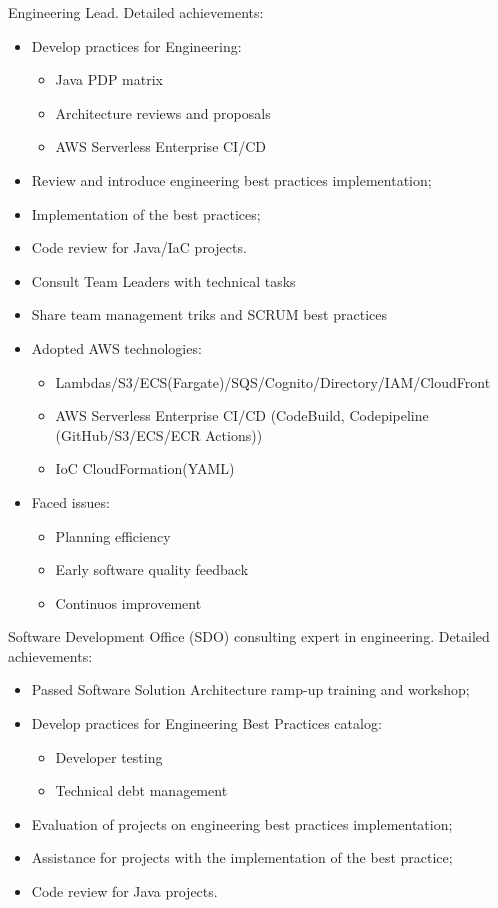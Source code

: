 \documentclass[11pt, a4paper]{moderncv}
\begin{document}
{
Engineering Lead.
\newline{}
Detailed achievements:
\begin{itemize}
\item Develop practices for Engineering:
\begin{itemize}
\item Java PDP matrix
\item Architecture reviews and proposals
\item AWS Serverless Enterprise CI/CD
\end{itemize}
\item Review and introduce engineering best practices implementation;
\item Implementation of the best practices;
\item Code review for Java/IaC projects.
\item Consult Team Leaders with technical tasks
\item Share team management triks and SCRUM best practices
\item Adopted AWS technologies:
\begin{itemize}
\item Lambdas/S3/ECS(Fargate)/SQS/Cognito/Directory/IAM/CloudFront
\item AWS Serverless Enterprise CI/CD (CodeBuild, Codepipeline (GitHub/S3/ECS/ECR Actions))
\item IoC CloudFormation(YAML)
\end{itemize}
\item Faced issues:
\begin{itemize}
\item Planning efficiency
\item Early software quality feedback
\item Continuos improvement
\end{itemize}
\end{itemize}
}

{
Software Development Office (SDO) consulting expert in engineering.
\newline{}
Detailed achievements:
\begin{itemize}
\item Passed Software Solution Architecture ramp-up training and workshop;
\item Develop practices for Engineering Best Practices catalog:
\begin{itemize}
\item Developer testing
\item Technical debt management
\end{itemize}
\item Evaluation of projects on engineering best practices implementation;
\item Assistance for projects with the implementation of the best practice;
\item Code review for Java projects.
\end{itemize}
}
\end{document}
